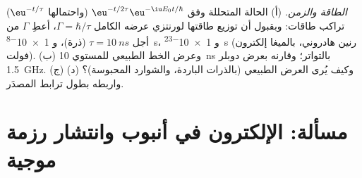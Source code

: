\begin{exercise}[$\star\star\star$]\label{exo:b2:schrodinger-wave-functions:12}
\emph{الطاقة والزمن.} (أ) الحالة المتحللة وفق $\eu^{-t/2\tau}\eu^{-\iu E_0t/\hbar}$
(واحتمالها $\eu^{-t/\tau}$) تراكب طاقات: وبقبول
أن توزيع طاقتها لورنتزي عرضه الكامل $\Gamma =
\hbar/\tau$، أعطِ $\Gamma$ من أجل $\tau = \qty{10}{ns}$ (ذرة)، و \qty{1e-8}{s}،
و \qty{1e-23}{s} (رنين هادروني، بالميغا إلكترون فولت). (ب) وعرض الخط الطبيعي
للمستوي \qty{10}{ns} بالتواتر؛ وقارنه بعرض دوبلر
\qty{1.5}{GHz}. (ج) وكيف يُرى العرض الطبيعي (بالذرات الباردة،
والشوارد المحبوسة)؟ (د) واربطه بطول ترابط  المصدَر.
\end{exercise}

\section{مسألة: الإلكترون في أنبوب وانتشار رزمة موجية}

